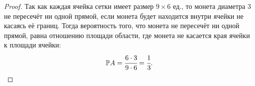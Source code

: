 \begin{proof}
	Так как каждая ячейка сетки имеет размер $9\times6$ ед., то монета диаметра 3 не пересечёт ни одной прямой, если монета будет находится внутри ячейки не касаясь её границ. Тогда вероятность того, что монета не пересечёт ни одной прямой, равна отношению площади области, где монета не касается края ячейки к площади ячейки:
	\[
		\mathbb P A = \cfrac{6 \cdot 3}{9 \cdot 6} = \cfrac{1}{3}.
	\]



\end{proof}
